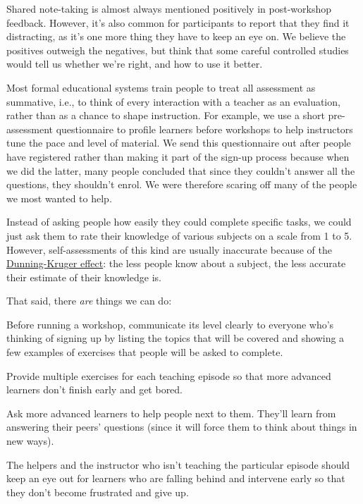 Shared note-taking is almost always mentioned positively in
post-workshop feedback.  However, it's also common for participants to
report that they find it distracting, as it's one more thing they have
to keep an eye on.  We believe the positives outweigh the negatives,
but think that some careful controlled studies would tell us whether
we're right, and how to use it better.


Most formal educational systems train people to treat all assessment
as summative, i.e., to think of every interaction with a teacher as an
evaluation, rather than as a chance to shape instruction.  For
example, we use a short pre-assessment questionnaire to profile
learners before workshops to help instructors tune the pace and level
of material. We send this questionnaire out after people have
registered rather than making it part of the sign-up process because
when we did the latter, many people concluded that since they couldn't
answer all the questions, they shouldn't enrol. We were therefore
scaring off many of the people we most wanted to help.

Instead of asking people how easily they could complete specific tasks,
we could just ask them to rate their knowledge of various subjects on a
scale from 1 to 5. However, self-assessments of this kind are usually
inaccurate because of the
\href{https://en.wikipedia.org/wiki/Dunning\%E2\%80\%93Kruger\_effect}{Dunning-Kruger
effect}: the less people know about a subject, the less accurate their
estimate of their knowledge is.

That said, there \emph{are} things we can do:

\begin{gitemize}

\item
  Before running a workshop, communicate its level clearly to everyone
  who's thinking of signing up by listing the topics that will be
  covered and showing a few examples of exercises that people will be
  asked to complete.

\item
  Provide multiple exercises for each teaching episode so that more
  advanced learners don't finish early and get bored.

\item
  Ask more advanced learners to help people next to them. They'll
  learn from answering their peers' questions (since it will force
  them to think about things in new ways).

\item
  The helpers and the instructor who isn't teaching the particular
  episode should keep an eye out for learners who are falling behind
  and intervene early so that they don't become frustrated and give
  up.

\end{gitemize}

